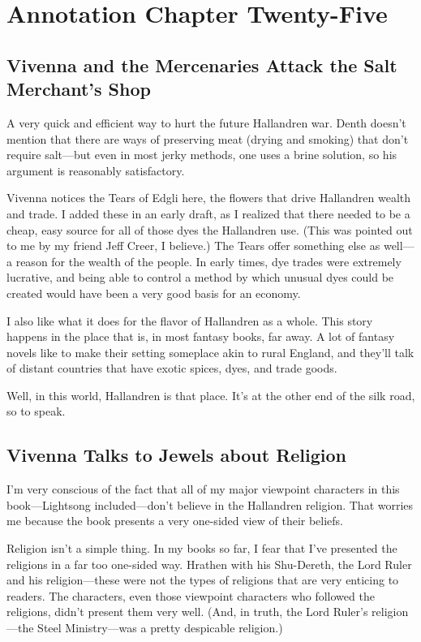 \section{Annotation Chapter Twenty-Five}

\subsection*{Vivenna and the Mercenaries Attack the Salt Merchant’s Shop}

A very quick and efficient way to hurt the future Hallandren war. Denth doesn’t mention that there are ways of preserving meat (drying and smoking) that don’t require salt—but even in most jerky methods, one uses a brine solution, so his argument is reasonably satisfactory.

Vivenna notices the Tears of Edgli here, the flowers that drive Hallandren wealth and trade. I added these in an early draft, as I realized that there needed to be a cheap, easy source for all of those dyes the Hallandren use. (This was pointed out to me by my friend Jeff Creer, I believe.) The Tears offer something else as well—a reason for the wealth of the people. In early times, dye trades were extremely lucrative, and being able to control a method by which unusual dyes could be created would have been a very good basis for an economy.

I also like what it does for the flavor of Hallandren as a whole. This story happens in the place that is, in most fantasy books, far away. A lot of fantasy novels like to make their setting someplace akin to rural England, and they’ll talk of distant countries that have exotic spices, dyes, and trade goods.

Well, in this world, Hallandren is that place. It’s at the other end of the silk road, so to speak.

\subsection*{Vivenna Talks to Jewels about Religion}

I’m very conscious of the fact that all of my major viewpoint characters in this book—Lightsong included—don’t believe in the Hallandren religion. That worries me because the book presents a very one-sided view of their beliefs.

Religion isn’t a simple thing. In my books so far, I fear that I’ve presented the religions in a far too one-sided way. Hrathen with his Shu-Dereth, the Lord Ruler and his religion—these were not the types of religions that are very enticing to readers. The characters, even those viewpoint characters who followed the religions, didn’t present them very well. (And, in truth, the Lord Ruler’s religion—the Steel Ministry—was a pretty despicable religion.)

